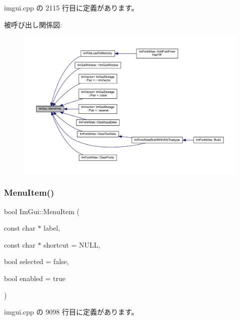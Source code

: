  imgui.\+cpp の 2115 行目に定義があります。

被呼び出し関係図\+:\nopagebreak
\begin{figure}[H]
\begin{center}
\leavevmode
\includegraphics[width=350pt]{namespace_im_gui_a269ec695c6e722ec3da85dae37f0675d_icgraph}
\end{center}
\end{figure}
\mbox{\label{namespace_im_gui_aa1bae511ca47478998693a9d8c84f2e6}} 
\subsubsection{\texorpdfstring{Menu\+Item()}{MenuItem()}\hspace{0.1cm}{\footnotesize\ttfamily [1/2]}}
{\footnotesize\ttfamily bool Im\+Gui\+::\+Menu\+Item (\begin{DoxyParamCaption}\item[{const char $\ast$}]{label,  }\item[{const char $\ast$}]{shortcut = {\ttfamily NULL},  }\item[{bool}]{selected = {\ttfamily false},  }\item[{bool}]{enabled = {\ttfamily true} }\end{DoxyParamCaption})}



 imgui.\+cpp の 9098 行目に定義があります。

